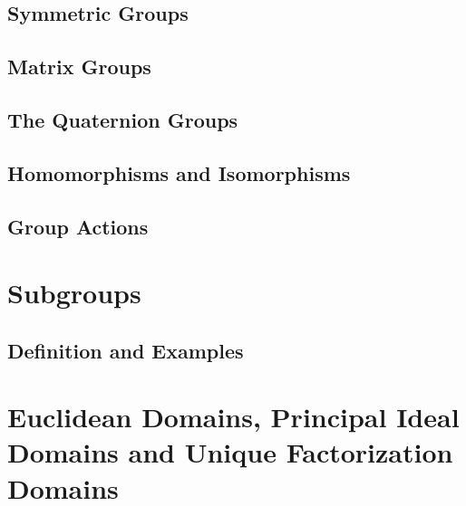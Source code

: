 \documentclass[cn,11pt,chinese]{elegantbook}
\numberwithin{equation}{section}
\begin{document}
\section{Symmetric Groups}\label{section00103}



\section{Matrix Groups}\label{section00104}



\section{The Quaternion Groups}\label{section00105}



\section{Homomorphisms and Isomorphisms}\label{section00106}



\section{Group Actions}\label{section00107}




\chapter{Subgroups}\label{chapter002}
\section{Definition and Examples}\label{section00201}


\chapter{Euclidean Domains, Principal Ideal Domains and Unique Factorization Domains}\label{chapter008}





% 

\appendix
\end{document}
